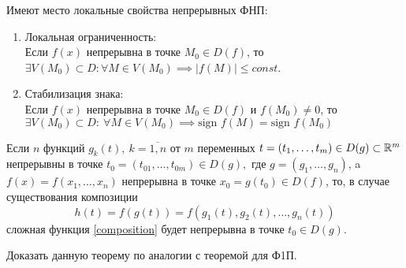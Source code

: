 \documentclass[../../main.tex]{subfiles}
\begin{document}
    Имеют место локальные свойства непрерывных ФНП:
    \begin{enumerate}
    	\item Локальная ограниченность: \\
    	Если $f(x)$ непрерывна в точке $M_0 \in D(f)$, то $\exists V(M_0)
    	\subset D : \forall M \in V(M_0) \implies |f(M)| \leq const$.
    	\item Стабилизация знака: \\
    	Если $f(x)$ непрерывна в точке $M_0 \in D(f)$ и $f(M_0) \ne 0$, то 
       $\exists V(M_0) \subset D: \ \forall M \in V(M_0) 
       \implies \text{sign }
       f(M)	= \text{sign }f(M_0)$
    \end{enumerate}
    \begin{thm}
    	Если $n$ функций $g_k(t),\ k = 
    	\overline{1,n}$ от $m$ переменных $t = (t_1, \ldots, t_m) \in D(g) 
    	\subset \mathbb{R}^m$ непрерывны в точке $t_0 = \left( t_{01}, \ldots, t_{0m} 
    	\right) \in D(g),$ где $g = (g_1, \ldots, g_n)$, a $f(x) = 
    	f(x_1, \ldots, x_n)$ непрерывна в точке $x_0 = g(t_0) \in D(f)$,
    	то, в случае существования композиции 
    	\begin{equation}
    	\label{composition}
    		h(t) = f(g(t)) = f(g_1(t), g_2(t), \ldots, g_n(t))
    	\end{equation}
        сложная функция \eqref{composition} будет непрерывна в точке 
        $t_0 \in D(g)$.
    \end{thm}
    \begin{exc}
    	Доказать данную теорему по аналогии с теоремой для Ф1П.
    \end{exc}
\end{document}
